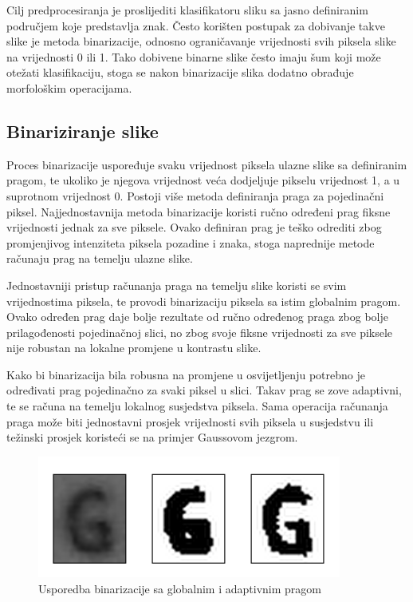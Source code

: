 \documentclass[lmodern, utf8, diplomski, numeric]{fer}
\begin{document}
Cilj predprocesiranja je proslijediti klasifikatoru sliku sa jasno definiranim područjem koje predstavlja znak. Često korišten postupak za dobivanje takve slike je metoda binarizacije, odnosno ograničavanje vrijednosti svih piksela slike na vrijednosti 0 ili 1. Tako dobivene binarne slike često imaju šum koji može otežati klasifikaciju, stoga se nakon binarizacije slika dodatno obrađuje morfološkim operacijama.

\subsection{Binariziranje slike}

Proces binarizacije uspoređuje svaku vrijednost piksela ulazne slike sa definiranim pragom, te ukoliko je njegova vrijednost veća dodjeljuje pikselu vrijednost 1, a u suprotnom vrijednost 0. Postoji više metoda definiranja praga za pojedinačni piksel. Najjednostavnija metoda binarizacije koristi ručno određeni prag fiksne vrijednosti jednak za sve piksele. Ovako definiran prag je teško odrediti zbog promjenjivog intenziteta piksela pozadine i znaka, stoga naprednije metode računaju prag na temelju ulazne slike. 

Jednostavniji pristup računanja praga na temelju slike koristi se svim vrijednostima piksela, te provodi binarizaciju piksela sa istim globalnim pragom. Ovako određen prag daje bolje rezultate od ručno određenog praga zbog bolje prilagođenosti pojedinačnoj slici, no zbog svoje fiksne vrijednosti za sve piksele nije robustan na lokalne promjene u kontrastu slike. 

Kako bi binarizacija bila robusna na promjene u osvijetljenju potrebno je određivati prag pojedinačno za svaki piksel u slici. Takav prag se zove adaptivni, te se računa na temelju lokalnog susjedstva piksela. Sama operacija računanja praga može biti jednostavni prosjek vrijednosti svih piksela u susjedstvu ili težinski prosjek koristeći se na primjer Gaussovom jezgrom. 


\begin{figure}[ht!]
\centering
\includegraphics[width=10cm]{slike/thresholding_example.png}
\caption{Usporedba binarizacije sa globalnim i adaptivnim pragom}
\end{figure}
\end{document}
